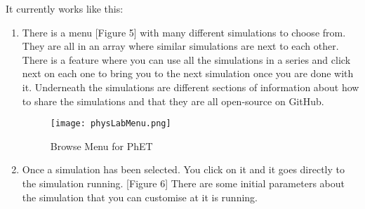 \documentclass[12pt]{article}
\begin{document}
It currently works like this:
\setlength\itemsep{-0.25em}
\begin{enumerate}
    \item There is a menu [Figure 5] with many different simulations to choose from. They are all in an array where similar simulations are next to each other. There is a feature where you can use all the simulations in a series and click next on each one to bring you to the next simulation once you are done with it. Underneath the simulations are different sections of information about how to share the simulations and that they are all open-source on GitHub. \cite{openSourcePhysLab}
    
\begin{figure}[!htb]
  \centering
  \texttt{[image: physLabMenu.png]}
  \caption{Browse Menu for PhET}\label{Fig:Figure 5}
\end{figure}
\newpage
    \item Once a simulation has been selected. You click on it and it goes directly to the simulation running. [Figure 6] There are some initial parameters about the simulation that you can customise at it is running.


\end{enumerate}
\end{document}
